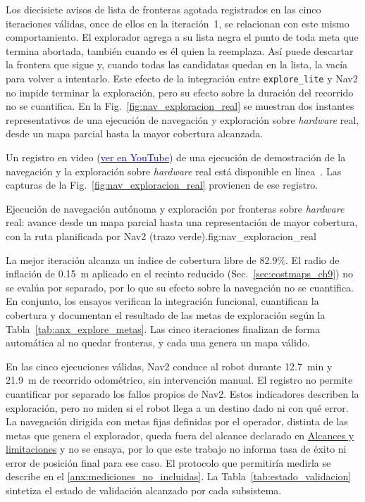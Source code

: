 Los diecisiete avisos de lista de fronteras agotada registrados en las cinco
iteraciones válidas, once de ellos en la iteración~1, se relacionan con este
mismo comportamiento. El explorador agrega a su lista negra el punto de toda
meta que termina abortada, también cuando es él quien la reemplaza. Así puede
descartar la frontera que sigue y, cuando todas las candidatas quedan
en la lista, la vacía para volver a intentarlo. Este efecto de la integración
entre \texttt{explore\_lite} y Nav2 no impide terminar la exploración, pero su
efecto sobre la duración del recorrido no se cuantifica. En la Fig.~\ref{fig:nav_exploracion_real} se muestran dos instantes representativos de una ejecución de navegación y exploración sobre \textit{hardware} real, desde un mapa parcial hasta la mayor cobertura alcanzada.

Un registro en video (\href{https://www.youtube.com/watch?v=iTTC10eGDmc}{\textcolor{blue}{ver en YouTube}}) de una ejecución de demostración de la navegación y la exploración sobre \textit{hardware} real está disponible en línea~\citep{valderas2026video}. Las capturas de la Fig.~\ref{fig:nav_exploracion_real} provienen de ese registro.

\begin{utemMultiFigurePropia}{Ejecución de navegación autónoma y exploración por fronteras sobre \textit{hardware} real: avance desde un mapa parcial hasta una representación de mayor cobertura, con la ruta planificada por Nav2 (trazo verde).}{fig:nav_exploracion_real}
\hfill
{}
\end{utemMultiFigurePropia}

La mejor iteración alcanza un índice de cobertura libre de 82.9\%. El
radio de inflación de 0.15~m aplicado en el recinto reducido
(Sec.~\ref{sec:costmaps_ch9}) no se evalúa por separado, por lo que su efecto
sobre la navegación no se cuantifica. En conjunto, los ensayos verifican la integración funcional, cuantifican la
cobertura y documentan el resultado de las metas de exploración según la
Tabla~\ref{tab:anx_explore_metas}. Las cinco iteraciones finalizan de forma
automática al no quedar fronteras, y cada una genera un mapa válido.

En las cinco ejecuciones válidas, Nav2 conduce al robot durante 12.7~min y
21.9~m de recorrido odométrico, sin intervención manual. El registro no permite
cuantificar por separado los fallos propios de Nav2. Estos indicadores describen la
exploración, pero no miden si el robot llega a un destino dado ni con qué
error. La navegación dirigida con metas fijas definidas por el operador,
distinta de las metas que genera el explorador, queda fuera del alcance
declarado en \hyperref[sec:alcances]{Alcances y limitaciones} y no se
ensaya, por lo que este trabajo no informa tasa de éxito ni error de posición
final para ese caso. El protocolo que permitiría medirla se describe en el
\ref{anx:mediciones_no_incluidas}. La Tabla~\ref{tab:estado_validacion}
sintetiza el estado de validación alcanzado por cada subsistema.

